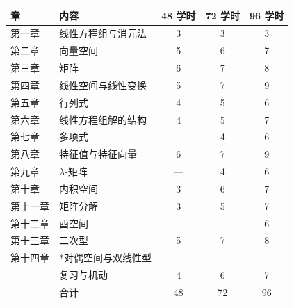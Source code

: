 \begin{center}
	\begin{tabular}{llccc}
		\toprule
		章 & 内容 & 48 学时 & 72 学时 & 96 学时 \\
		\midrule
		第一章 & 线性方程组与消元法 & 3 & 3 & 3 \\
		第二章 & 向量空间 & 5 & 6 & 7 \\
		第三章 & 矩阵 & 6 & 7 & 8 \\
		第四章 & 线性空间与线性变换 & 5 & 7 & 9 \\
		第五章 & 行列式 & 4 & 5 & 6 \\
		第六章 & 线性方程组解的结构 & 4 & 5 & 7 \\
		第七章 & 多项式 & — & 4 & 6 \\
		第八章 & 特征值与特征向量 & 6 & 7 & 9 \\
		第九章 & $\lambda$-矩阵 & — & 4 & 6 \\
		第十章 & 内积空间 & 3 & 6 & 7 \\
		第十一章 & 矩阵分解 & 3 & 5 & 7 \\
		第十二章 & 酉空间 & — & — & 6 \\
		第十三章 & 二次型 & 5 & 7 & 8 \\
		第十四章 & *对偶空间与双线性型 & — & — & — \\
		\midrule
		& 复习与机动 & 4 & 6 & 7 \\
		& 合计 & 48 & 72 & 96 \\
		\bottomrule
	\end{tabular}
\end{center}

